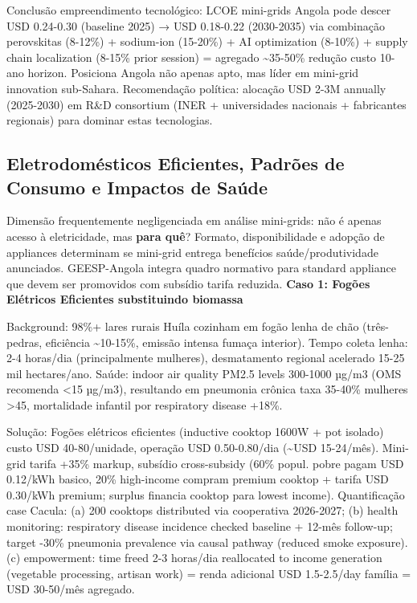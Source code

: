 \documentclass[12pt, a4paper]{article}
\begin{document}
Conclusão empreendimento tecnológico: LCOE mini-grids Angola pode descer USD 0.24-0.30 (baseline 2025) → USD 0.18-0.22 (2030-2035) via combinação perovskitas (8-12\%) + sodium-ion (15-20\%) + AI optimization (8-10\%) + supply chain localization (8-15\% prior session) = agregado \textasciitilde{}35-50\% redução custo 10-ano horizon. Posiciona Angola não apenas apto, mas líder em mini-grid innovation sub-Sahara. Recomendação política: alocação USD 2-3M annually (2025-2030) em R\&D consortium (INER + universidades nacionais + fabricantes regionais) para dominar estas tecnologias.

\subsection{Eletrodomésticos Eficientes, Padrões de Consumo e Impactos de Saúde}

Dimensão frequentemente negligenciada em análise mini-grids: não é apenas acesso à eletricidade, mas
\textbf{para quê}? Formato, disponibilidade e adopção de appliances determinam se mini-grid entrega benefícios saúde/produtividade anunciados. GEESP-Angola integra quadro normativo para standard appliance que devem ser promovidos com subsídio tarifa reduzida.
\textbf{Caso 1: Fogões Elétricos Eficientes substituindo biomassa}

Background: 98\%+ lares rurais Huíla cozinham em fogão lenha de chão (três-pedras, eficiência \textasciitilde{}10-15\%, emissão intensa fumaça interior). Tempo coleta lenha: 2-4 horas/dia (principalmente mulheres), desmatamento regional acelerado 15-25 mil hectares/ano. Saúde: indoor air quality PM2.5 levels 300-1000 µg/m3 (OMS recomenda <15 µg/m3), resultando em pneumonia crônica taxa 35-40\% mulheres >45, mortalidade infantil por respiratory disease +18\%. 

Solução: Fogões elétricos eficientes (inductive cooktop 1600W + pot isolado) custo USD 40-80/unidade, operação USD 0.50-0.80/dia (\textasciitilde{}USD 15-24/mês). Mini-grid tarifa +35\% markup, subsídio cross-subsidy (60\% popul. pobre pagam USD 0.12/kWh basico, 20\% high-income compram premium cooktop + tarifa USD 0.30/kWh premium; surplus financia cooktop para lowest income). Quantificação case Cacula: (a) 200 cooktops distributed via cooperativa 2026-2027; (b) health monitoring: respiratory disease incidence checked baseline + 12-mês follow-up; target -30\% pneumonia prevalence via causal pathway (reduced smoke exposure). (c) empowerment: time freed 2-3 horas/dia reallocated to income generation (vegetable processing, artisan work) = renda adicional USD 1.5-2.5/day família = USD 30-50/mês agregado.
\end{document}
